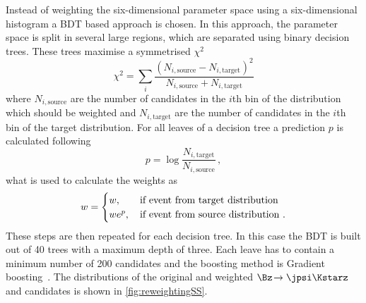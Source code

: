 Instead of weighting the six-dimensional parameter space using a six-dimensional histogram a BDT based approach is chosen.
In this approach, the parameter space is split in several large regions, which are separated using binary decision trees.
These trees maximise a symmetrised $\chi^2$
\begin{equation}
\chi^2=\sum_{i}\frac{\left(N_{i,\text{source}}-N_{i,\text{target}}\right)^2}{N_{i,\text{source}}+N_{i,\text{target}}}
\end{equation}
where $N_{i,\text{source}}$ are the number of candidates in the $i$th bin of the distribution which should be weighted and $N_{i,\text{target}}$ are the number of candidates in the $i$th bin of the target distribution.
For all leaves of a decision tree a prediction $p$ is calculated following
\begin{equation}
p=\log\frac{N_{i,\text{target}}}{N_{i,\text{source}}}\,,
\end{equation}
what is used to calculate the weights as
\begin{equation}
w=\begin{cases} w, &\, \text{if event from target distribution}\\ we^{p}, &\, \text{if event from source distribution\,\,.} \end{cases}
\end{equation}
These steps are then repeated for each decision tree.
In this case the BDT is built out of \num{40} trees with a maximum depth of three.
Each leave has to contain a minimum number of \num{200} candidates and the boosting method is Gradient boosting~\cite{Friedman00greedyfunction}.
The distributions of the original and weighted $\Bz\!\to\jpsi\Kstarz$ and \BdToDpi candidates is shown in \cref{fig:reweightingSS}.
